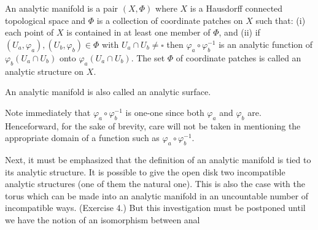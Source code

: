 An analytic manifold is a pair $(X, \Phi)$ where $X$ is a Hausdorff connected topological space and $\Phi$ is a collection of coordinate patches on $X$ such that: (i) each point of $X$ is contained in at least one member of $\Phi$, and (ii) if $(U_a, \varphi_a), (U_b, \varphi_b) \in \Phi$ with $U_a \cap U_b \neq \square$ then $\varphi_a \circ \varphi_b^{-1}$ is an analytic function of $\varphi_b(U_a \cap U_b)$ onto $\varphi_a(U_a \cap U_b)$. The set $\Phi$ of coordinate patches is called an analytic structure on $X$.

An analytic manifold is also called an analytic surface.

Note immediately that $\varphi_a \circ \varphi_b^{-1}$ is one-one since both $\varphi_a$ and $\varphi_b$ are. Henceforward, for the sake of brevity, care will not be taken in mentioning the appropriate domain of a function such as $\varphi_a \circ \varphi_b^{-1}$.

Next, it must be emphasized that the definition of an analytic manifold is tied to its analytic structure. It is possible to give the open disk two incompatible analytic structures (one of them the natural one). This is also the case with the torus which can be made into an analytic manifold in an uncountable number of incompatible ways. (Exercise 4.) But this investigation must be postponed until we have the notion of an isomorphism between anal